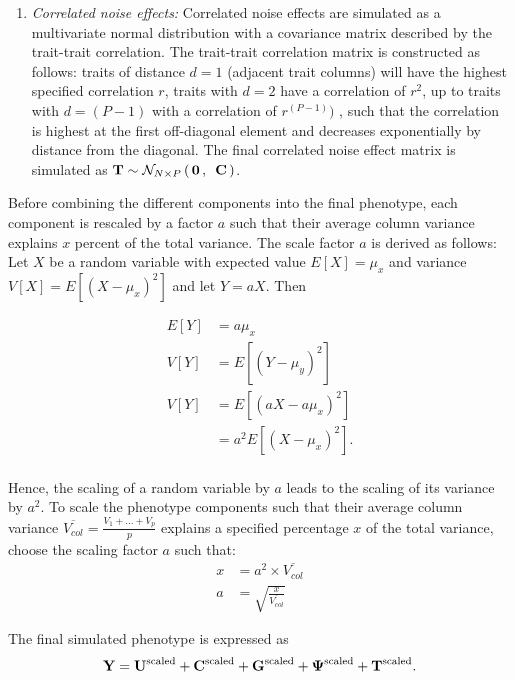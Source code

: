 \begin{enumerate}
\item \textit{Correlated noise effects:}  Correlated noise effects are simulated as a multivariate normal distribution with a covariance matrix described by the trait-trait correlation. The trait-trait correlation matrix  is constructed as follows: traits of distance \(d=1\) (adjacent trait columns) will have the highest specified correlation \(r\), traits with \(d=2\) have a correlation of \(r^2\), up to traits with \(d=(P - 1)\) with a correlation of \(r^{(P - 1)})\) , such that the correlation is highest at the first off-diagonal element and decreases exponentially by distance from the diagonal. The final correlated noise effect matrix is simulated as \(\boldsymbol{\mathbf{T}} \sim \mathcal{N}_{N\times P}\left(\, {\boldsymbol{\mathbf{0}}} \,,\,~{\boldsymbol{\mathbf{C}}} \,\right)\).
\end{enumerate}

Before combining the different components into the final phenotype, each component is rescaled by a factor \(a\) such that their average column variance explains \(x\) percent of the total variance. The scale factor \(a\) is derived as follows: 
Let \(X\) be a random variable with expected value \(E[X] = \mu_{x}\) and variance \(V[X] = E[(X - \mu_{x})^2]\) and let  \(Y = aX\). Then
  
\begin{equation}
\begin{aligned}
E[Y] &= a\mu_{x} \\
V[Y] &= E[(Y - \mu_{y})^2] \\
V[Y] &= E[(aX - a\mu_{x})^2] \\
		&= a^2 E[(X - \mu_{x})^2]. \\
\end{aligned}
\end{equation}

Hence, the scaling of a random variable by \(a\) leads to the scaling of its variance by \(a^2\). To scale the phenotype components such that their average column variance \(\overline{V_{col}} = \frac{V_1 + ... + V_p}{p} \) explains a specified  percentage \(x\) of the total variance, choose the scaling factor \(a\) such that: 
\begin{equation}
\begin{aligned}
x  &= a^2 \times \overline{V_{col}} \\
a  &= \sqrt{\frac{x}{\overline{V_{col}}}}
\end{aligned}
\end{equation}

The final simulated phenotype is expressed as
\begin{equation}
\boldsymbol{\mathbf{Y}} = \boldsymbol{\mathbf{U}}^{\text{scaled}}   + \boldsymbol{\mathbf{C}}^{\text{scaled}} +  \boldsymbol{\mathbf{G}}^{\text{scaled}} +  \boldsymbol{\mathbf{\Psi}}^{\text{scaled}} + \boldsymbol{\mathbf{T}}^{\text{scaled}}. 
\end{equation}

